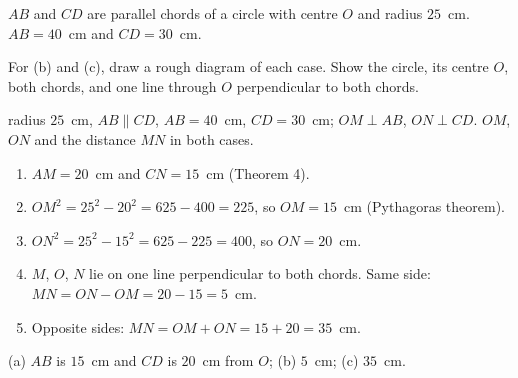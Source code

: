 \setcounter{qn}{10}

\ques $AB$ and $CD$ are parallel chords of a circle with centre $O$ and radius $25$~cm. $AB=40$~cm and $CD=30$~cm.

For (b) and (c), draw a rough diagram of each case. Show the circle, its centre $O$, both chords, and one line through $O$ perpendicular to both chords.

\begin{answerblock}
\begin{minipage}[t]{0.60\linewidth}\vspace{0pt}
\Given radius $25$~cm, $AB\parallel CD$, $AB=40$~cm, $CD=30$~cm; $OM\perp AB$, $ON\perp CD$. \Tofind $OM$, $ON$ and the distance $MN$ in both cases.
\begin{enumerate}[label=\arabic*.,leftmargin=1.6em,itemsep=0pt,topsep=2pt]
\item $AM=20$~cm and $CN=15$~cm (Theorem 4).
\item $OM^2=25^2-20^2=625-400=225$, so $OM=15$~cm (Pythagoras theorem).
\item $ON^2=25^2-15^2=625-225=400$, so $ON=20$~cm.
\item $M$, $O$, $N$ lie on one line perpendicular to both chords. Same side: $MN=ON-OM=20-15=5$~cm.
\item Opposite sides: $MN=OM+ON=15+20=35$~cm.
\end{enumerate}
\Ans (a) $AB$ is $15$~cm and $CD$ is $20$~cm from $O$; (b) $5$~cm; (c) $35$~cm.
\end{minipage}\hfill
\begin{minipage}[t]{0.38\linewidth}\vspace{0pt}
\centering
{}
\end{minipage}
\end{answerblock}
